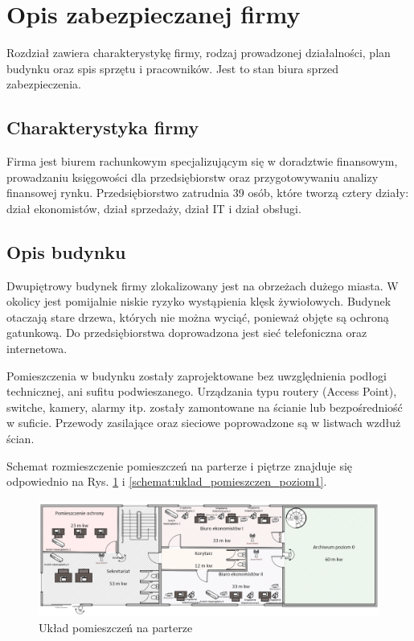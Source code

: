 \newpage\section{Opis zabezpieczanej firmy}
Rozdział zawiera charakterystykę firmy, rodzaj prowadzonej działalności, plan budynku oraz spis sprzętu i pracowników. Jest to stan biura sprzed zabezpieczenia.

\subsection{Charakterystyka firmy}
Firma jest biurem rachunkowym specjalizującym się w doradztwie \linebreak finansowym, prowadzaniu księgowości dla przedsiębiorstw oraz przygotowywaniu analizy finansowej rynku. Przedsiębiorstwo zatrudnia 39 osób, które tworzą cztery działy: dział ekonomistów, dział sprzedaży, dział IT i dział obsługi.

\subsection{Opis budynku}
Dwupiętrowy budynek firmy zlokalizowany jest na obrzeżach dużego miasta. W okolicy jest pomijalnie niskie ryzyko wystąpienia klęsk \linebreak żywiołowych. Budynek otaczają stare drzewa, których nie można wyciąć, ponieważ objęte są ochroną gatunkową. Do przedsiębiorstwa doprowadzona jest sieć telefoniczna oraz internetowa.

Pomieszczenia w budynku zostały zaprojektowane bez uwzględnienia podłogi technicznej, ani sufitu podwieszanego. Urządzania typu routery (Access Point), switche, kamery, alarmy itp. zostały zamontowane na ścianie lub bezpośredniość w suficie. Przewody zasilające oraz sieciowe poprowadzone są w listwach wzdłuż ścian.

Schemat rozmieszczenie pomieszczeń na parterze i piętrze znajduje się odpowiednio na Rys. \ref{schemat:uklad_pomieszczen_poziom0} i \ref{schemat:uklad_pomieszczen_poziom1}.

\begin{landscape}
	\begin{figure}[!h]
		\vspace{3cm}
		\includegraphics[width=24cm]{uklad_pomieszczen_poziom0.png}
		\caption{Układ pomieszczeń na parterze}
		\label{schemat:uklad_pomieszczen_poziom0}
	\end{figure}
\end{landscape}

